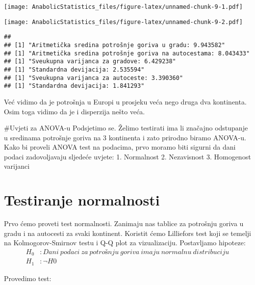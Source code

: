 \documentclass[
]{article}
\newenvironment{Shaded}{\begin{snugshade}}{\end{snugshade}}
\newcommand{\FloatTok}[1]{\textcolor[rgb]{0.00,0.00,0.81}{#1}}
\newcommand{\FunctionTok}[1]{\textcolor[rgb]{0.13,0.29,0.53}{\textbf{#1}}}
\newcommand{\NormalTok}[1]{#1}
\newcommand{\SpecialCharTok}[1]{\textcolor[rgb]{0.81,0.36,0.00}{\textbf{#1}}}
\begin{document}
\texttt{[image: AnabolicStatistics\_files/figure-latex/unnamed-chunk-9-1.pdf]}

\begin{Shaded}
\end{Shaded}

\texttt{[image: AnabolicStatistics\_files/figure-latex/unnamed-chunk-9-2.pdf]}

\begin{verbatim}
## 
## [1] "Aritmetička sredina potrošnje goriva u gradu: 9.943582"
## [1] "Aritmetička sredina potrošnje goriva na autocestama: 8.043433"
## [1] "Sveukupna varijanca za gradove: 6.429238"
## [1] "Standardna devijacija: 2.535594"
## [1] "Sveukupna varijanca za autoceste: 3.390360"
## [1] "Standardna devijacija: 1.841293"
\end{verbatim}

Već vidimo da je potrošnja u Europi u prosjeku veća nego druga dva
kontinenta. Osim toga vidimo da je i disperzija nešto veća.

\#Uvjeti za ANOVA-u Podsjetimo se. Želimo testirati ima li značajno
odstupanje u sredinama potrošnje goriva na 3 kontinenta i zato prirodno
biramo ANOVA-u. Kako bi proveli ANOVA test na podacima, prvo moramo biti
sigurni da dani podaci zadovoljavaju sljedeće uvjete: 1. Normalnost 2.
Nezavisnost 3. Homogenost varijanci

\section{Testiranje normalnosti}\label{testiranje-normalnosti}

Prvo ćemo proveti test normalnosti. Zanimaju nas tablice za potrošnju
goriva u gradu i na autocesti za svaki kontinent. Koristit ćemo
Lilliefors test koji se temelji na Kolmogorov-Smirnov testu i Q-Q plot
za vizualizaciju. Postavljamo hipoteze: \[\begin{aligned}
H_0 &: Dani\ podaci\ za\ potrošnju\ goriva\ imaju\ normalnu\ distribuciju\\
H_1 &: \neg H0
\end{aligned}\]

Provedimo test:
\end{document}
